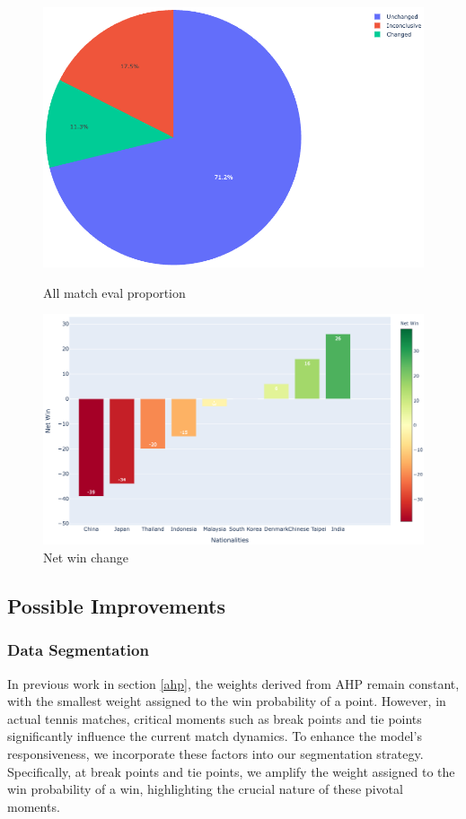 \documentclass{mcmthesis}
\begin{document}
\begin{figure}[ht]
\begin{minipage}{0.3\textwidth}
        \includegraphics[width=\textwidth]{figures/badminton/All_match_eval_proportion.png} %
        \caption{All match eval proportion}
        \label{fig:All match eval proportion}
    \end{minipage}
    \begin{minipage}{0.35\textwidth}
        \centering
        \includegraphics[width=\textwidth]{figures/badminton/Net_win_change.png} %
        \caption{Net win change}
        \label{fig:Net win}
    \end{minipage}\hfill
\end{figure}

\subsection{Possible Improvements}
\subsubsection{Data Segmentation}
In previous work in section \ref{ahp}, the weights derived from AHP remain constant, with the smallest weight assigned to the win probability of a point. However, in actual tennis matches, critical moments such as break points and tie points significantly influence the current match dynamics. To enhance the model's responsiveness, we incorporate these factors into our segmentation strategy. Specifically, at break points and tie points, we amplify the weight assigned to the win probability of a win, highlighting the crucial nature of these pivotal moments.
\end{document}
